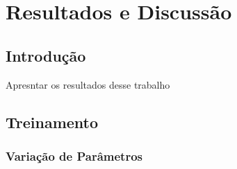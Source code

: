 \chapter{Resultados e Discussão}

\section{Introdução} 

Apresntar os resultados desse trabalho

\section{Treinamento} 

\subsection{Variação de Parâmetros}

